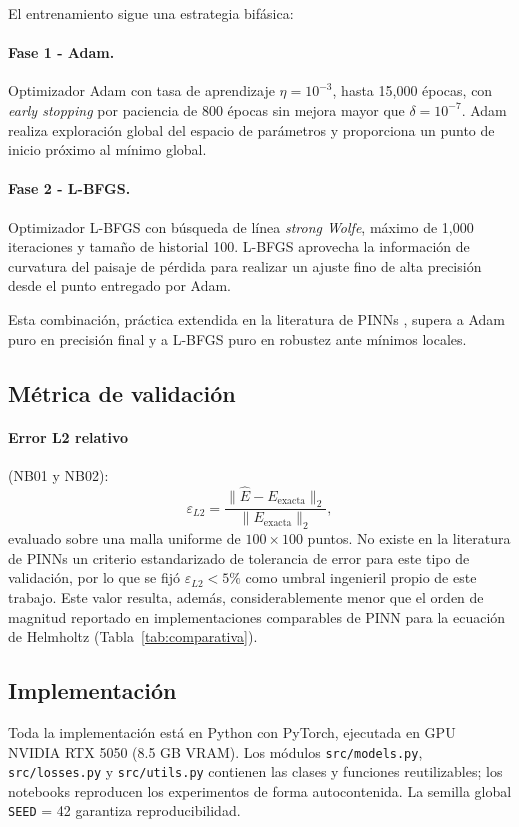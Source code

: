 El entrenamiento sigue una estrategia bifásica:

\paragraph{Fase 1 - Adam.}
Optimizador Adam con tasa de aprendizaje $\eta = 10^{-3}$, hasta 15{,}000 épocas,
con \textit{early stopping} por paciencia de 800 épocas sin mejora mayor que
$\delta = 10^{-7}$.
Adam realiza exploración global del espacio de parámetros y proporciona un punto
de inicio próximo al mínimo global.

\paragraph{Fase 2 - L-BFGS.}
Optimizador L-BFGS con búsqueda de línea \textit{strong Wolfe}, máximo de 1{,}000
iteraciones y tamaño de historial 100.
L-BFGS aprovecha la información de curvatura del paisaje de pérdida para realizar
un ajuste fino de alta precisión desde el punto entregado por Adam.

Esta combinación, práctica extendida en la literatura de PINNs \cite{Cuomo2022_review},
supera a Adam puro en precisión final y a L-BFGS puro en robustez ante mínimos locales.

\subsection{Métrica de validación}
\label{subsec:metricas}

\paragraph{Error L2 relativo} (NB01 y NB02):
%
\begin{equation}
  \varepsilon_{L2} = \frac{\|\hat{E} - E_{\mathrm{exacta}}\|_2}{\|E_{\mathrm{exacta}}\|_2},
  \label{eq:l2}
\end{equation}
%
evaluado sobre una malla uniforme de $100 \times 100$ puntos.
No existe en la literatura de PINNs un criterio estandarizado de tolerancia de error
para este tipo de validación, por lo que se fijó $\varepsilon_{L2} < 5\%$ como umbral
ingenieril propio de este trabajo. Este valor resulta, además, considerablemente menor
que el orden de magnitud reportado en implementaciones comparables de PINN para la
ecuación de Helmholtz (Tabla~\ref{tab:comparativa}).

\subsection{Implementación}
\label{subsec:implementacion}

Toda la implementación está en Python con PyTorch, ejecutada en GPU NVIDIA RTX 5050
(8.5 GB VRAM).
Los módulos \texttt{src/models.py}, \texttt{src/losses.py} y \texttt{src/utils.py}
contienen las clases y funciones reutilizables; los notebooks reproducen los experimentos
de forma autocontenida.
La semilla global \texttt{SEED} = 42 garantiza reproducibilidad.
